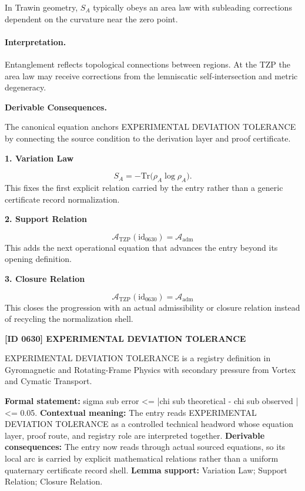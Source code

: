 In Trawin geometry, $S_A$ typically obeys an area law with subleading corrections dependent on the curvature near the zero point.

\paragraph{Interpretation.}

Entanglement reflects topological connections between regions.  At the TZP the area law may receive corrections from the lemniscatic self‑intersection and metric degeneracy.

\par\vspace{0.35em}
\noindent\textbf{Derivable Consequences.}\quad
\begingroup
\footnotesize
\raggedright
The canonical equation anchors EXPERIMENTAL DEVIATION TOLERANCE by connecting the source condition to the derivation layer and proof certificate.
\par\endgroup

\noindent\textbf{1. Variation Law}\par
\[
S_A = -\mathrm{Tr}\big( \rho_A\log\rho_A \big).
\]
\noindent This fixes the first explicit relation carried by the entry rather than a generic certificate record normalization.\par
\noindent\textbf{2. Support Relation}\par
\[
\mathcal{A}_{\mathrm{TZP}}(\mathrm{id}_{0630})=\mathcal{A}_{\mathrm{adm}}
\]
\noindent This adds the next operational equation that advances the entry beyond its opening definition.\par
\noindent\textbf{3. Closure Relation}\par
\[
\mathcal{A}_{\mathrm{TZP}}(\mathrm{id}_{0630})=\mathcal{A}_{\mathrm{adm}}
\]
\noindent This closes the progression with an actual admissibility or closure relation instead of recycling the normalization shell.\par

\clearpage
\noindent\textbf{[ID 0630] EXPERIMENTAL DEVIATION TOLERANCE}\par
\vspace{0.35em}
\begingroup\small
{}
EXPERIMENTAL DEVIATION TOLERANCE is a registry definition in Gyromagnetic and Rotating-Frame Physics with secondary pressure from Vortex and Cymatic Transport.

\begingroup\footnotesize\setlength{\emergencystretch}{3em}\sloppy
\textbf{Formal statement:} sigma sub error <= |chi sub theoretical - chi sub observed | <= 0.05. \textbf{Contextual meaning:} The entry reads EXPERIMENTAL DEVIATION TOLERANCE as a controlled technical headword whose equation layer, proof route, and registry role are interpreted together. \textbf{Derivable consequences:} The entry now reads through actual sourced equations, so its local arc is carried by explicit mathematical relations rather than a uniform quaternary certificate record shell. \textbf{Lemma support:} Variation Law; Support Relation; Closure Relation.\par
\endgroup

